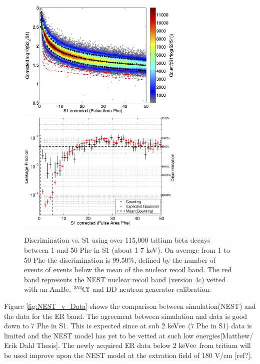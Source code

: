 \begin{figure}[h!]\centering
\includegraphics[width=80mm]{CH3T_fid_50_Tritium_Dec_2013_S2_100Phe_cut.png}
\includegraphics[width=80mm]{CH3T_Leakage_fid_50_Tritium_Dec_2013_S2_100Phe_cut.eps}
\caption{Discrimination vs. S1 using over 115,000 tritium beta decays between 1 and 50 Phe in S1 (about 1-7 keV). On average from 1 to 50 Phe the discrimination is 99.50\%, defined by the number of events of events below the mean of the nuclear recoil band. The red band represents the NEST nuclear recoil band (version 4c) vetted with an AmBe, $\rm^{252}Cf$ and DD neutron generator calibration.}
\label{fig:Leak}
\end{figure}


Figure \ref{fig:NEST_v_Data} shows the comparison between simulation(NEST) and the data for the ER band. The agreement between simulation and data is good down to 7 Phe in S1. This is expected since at sub 2 $\rm keV{ee}$ (7 Phe in S1) data is limited and the NEST model has yet to be vetted at such low energies[Matthew/ Erik Dahl Thesis]. The newly acquired ER data below 2 $\rm keV{ee}$ from tritium will be used improve upon the NEST model at the extration field of 180 V/cm [ref?].

